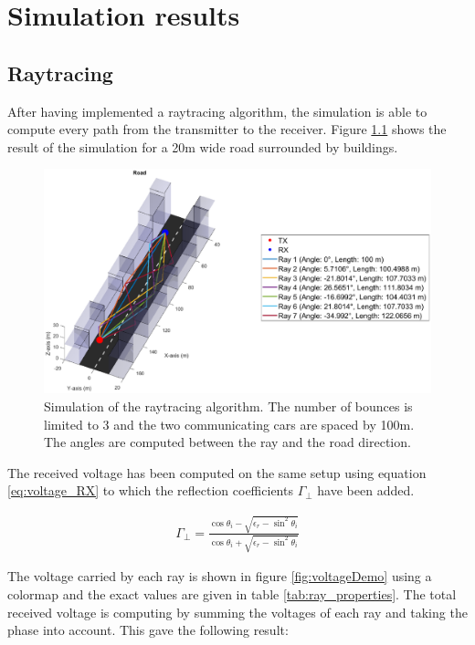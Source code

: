 \documentclass[10pt,a4paper]{ULBreport}
\begin{document}
\chapter{Simulation results}
\section{Raytracing}

After having implemented a raytracing algorithm, the simulation is able to compute every path from the transmitter to the receiver. Figure \ref{fig:raytracingDemo} shows the result of the simulation for a 20m wide road surrounded by buildings. 

\begin{figure}[H]
    \centering
    \includegraphics[width=1\textwidth]{3_1.eps}
    \caption{Simulation of the raytracing algorithm. The number of bounces is limited to 3 and the two communicating cars are spaced by 100m. The angles are computed between the ray and the road direction.}
    \label{fig:raytracingDemo}
\end{figure}

The received voltage has been computed on the same setup using equation \ref{eq:voltage_RX} to which the reflection coefficients $\Gamma_{\perp}$ have been added. 

\begin{align*}
    \Gamma_{\perp} = \frac{\cos \theta_i - \sqrt{\epsilon_r-\sin^2\theta_i}}{\cos \theta_i + \sqrt{\epsilon_r-\sin^2\theta_i}}
\end{align*}

The voltage carried by each ray is shown in figure \ref{fig:voltageDemo} using a colormap and the exact values are given in table \ref{tab:ray_properties}. The total received voltage is computing by summing the voltages of each ray and taking the phase into account. This gave the following result:
\end{document}
